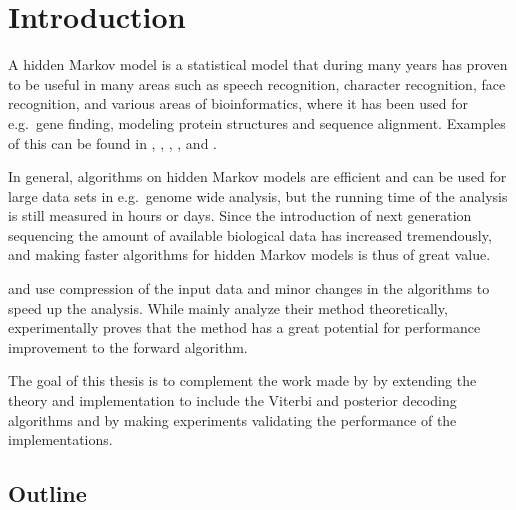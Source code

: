 \chapter{Introduction}

A hidden Markov model is a statistical model that during many years has proven
to be useful in many areas such as speech recognition, character recognition,
face recognition, and various areas of bioinformatics, where it has been
used for e.g.\ gene finding, modeling protein structures and sequence
alignment. Examples of this can be found in \citet{rabiner1989tutorial},
\citet{agazzi1993hidden}, \citet{nefian1998hidden},
\citet{burge1997prediction}, and \citet{eddy1998profile}.

In general, algorithms on hidden Markov models are efficient and can be used
for large data sets in e.g.\ genome wide analysis, but the running time of the
analysis is still measured in hours or days. Since the introduction of next
generation sequencing the amount of available biological data has increased
tremendously, and making faster algorithms for hidden Markov models is thus of
great value.

\citet{lifshits2009speeding} and \citet{sand2013ziphmmlib} use compression of
the input data and minor changes in the algorithms to speed up the
analysis. While \citet{lifshits2009speeding} mainly analyze their method
theoretically, \citet{sand2013ziphmmlib} experimentally proves that the method
has a great potential for performance improvement to the forward algorithm.

The goal of this thesis is to complement the work made by \citet{sand2013ziphmmlib}
by extending the theory and implementation to include the Viterbi and posterior decoding
algorithms and by making experiments validating the performance of the implementations.

\newpage{}

\section{Outline}

